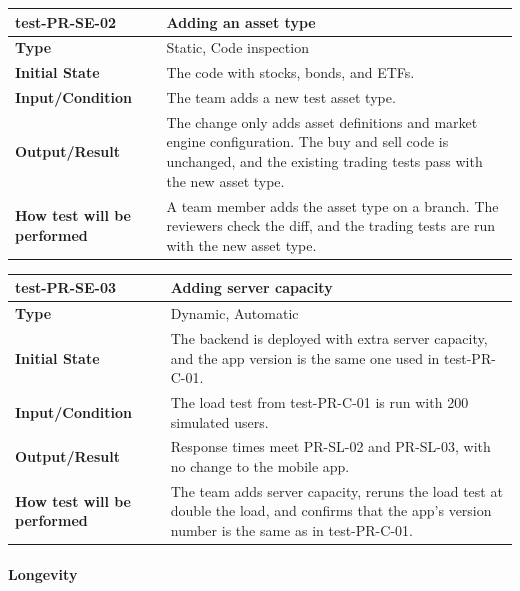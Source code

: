 \documentclass[12pt, titlepage]{article}
\begin{document}
\vspace{1em}

\noindent\begin{tabularx}{\textwidth}{>{\raggedright\arraybackslash}p{3.5cm}X}
  \toprule
  \textbf{test-PR-SE-02} & \textbf{Adding an asset type}\\
  \midrule
  \textbf{Type} & Static, Code inspection\\
  \textbf{Initial State} & The code with stocks, bonds, and ETFs.\\
  \textbf{Input/Condition} & The team adds a new test asset type.\\
  \textbf{Output/Result} & The change only adds asset definitions and market engine configuration. The buy and sell code is unchanged, and the existing trading tests pass with the new asset type.\\
  \textbf{How test will be performed} & A team member adds the asset type on a branch. The reviewers check the diff, and the trading tests are run with the new asset type.\\
  \bottomrule
\end{tabularx}

\vspace{1em}

\noindent\begin{tabularx}{\textwidth}{>{\raggedright\arraybackslash}p{3.5cm}X}
  \toprule
  \textbf{test-PR-SE-03} & \textbf{Adding server capacity}\\
  \midrule
  \textbf{Type} & Dynamic, Automatic\\
  \textbf{Initial State} & The backend is deployed with extra server capacity, and the app version is the same one used in test-PR-C-01.\\
  \textbf{Input/Condition} & The load test from test-PR-C-01 is run with 200 simulated users.\\
  \textbf{Output/Result} & Response times meet PR-SL-02 and PR-SL-03, with no change to the mobile app.\\
  \textbf{How test will be performed} & The team adds server capacity, reruns the load test at double the load, and confirms that the app's version number is the same as in test-PR-C-01.\\
  \bottomrule
\end{tabularx}

\paragraph{Longevity}
\end{document}
